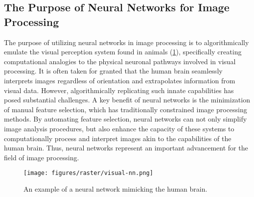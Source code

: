 \subsection{The Purpose of Neural Networks for Image Processing}

The purpose of utilizing neural networks in image processing is to algorithmically emulate the visual perception system found in animals (\cref{fig:nn-purpose-zebra}), specifically creating computational analogies to the physical neuronal pathways involved in visual processing.
It is often taken for granted that the human brain seamlessly interprets images regardless of orientation and extrapolates information from visual data. However, algorithmically replicating such innate capabilities has posed substantial challenges.
A key benefit of neural networks is the minimization of manual feature selection, which has traditionally constrained image processing methods.
By automating feature selection, neural networks can not only simplify image analysis procedures, but also enhance the capacity of these systems to computationally process and interpret images akin to the capabilities of the human brain.
Thus, neural networks represent an important advancement for the field of image processing.


\begin{figure}[h!]
  \centering
  \texttt{[image: figures/raster/visual-nn.png]}
  \caption{An example of a neural network mimicking the human brain.}
  \label{fig:nn-purpose-zebra}
\end{figure}


